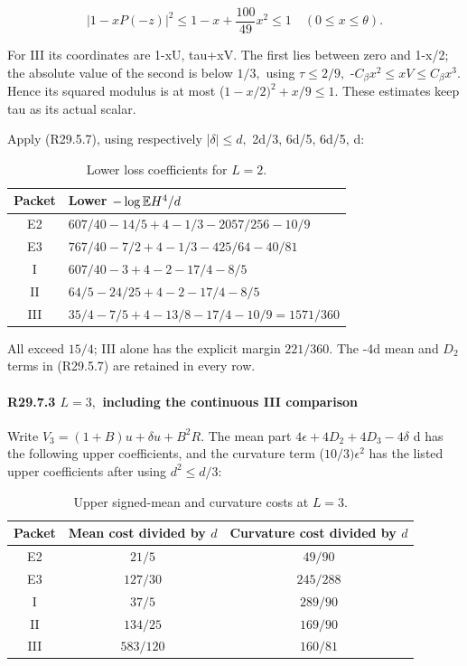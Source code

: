 \[
|1-xP(-z)|^2\le1-x+\frac{100}{49}x^2\le1
\quad(0\le x\le\theta).
\]

For III its coordinates are 1-xU, tau+xV. The first lies between
zero and 1-x/2; the absolute value of the second is below \(1/3,\allowbreak \)
using \(\tau\le 2/9,\allowbreak \) -\(C_\beta x^2\le xV\le C_\beta x^3.\)
Hence its squared modulus is at most
(\(1-x/2)^2+x/9\le 1.\) These estimates keep tau as its actual scalar.

Apply (R29.5.7), using respectively |\(\delta|\le d,\allowbreak \) 2d/3, 6d/5, 6d/5, d:

\begin{table}[htbp]
\centering\small
\setlength{\tabcolsep}{5pt}
\caption{Lower loss coefficients for $L=2$.}\label{tab:oc:r29-L2}
\begin{tabular}{cl}
\toprule
Packet & Lower $-\log\mathbb E H^4/d$\\
\midrule
E2 & $607/40-14/5+4-1/3-2057/256-10/9$\\
E3 & $767/40-7/2+4-1/3-425/64-40/81$\\
I & $607/40-3+4-2-17/4-8/5$\\
II & $64/5-24/25+4-2-17/4-8/5$\\
III & $35/4-7/5+4-13/8-17/4-10/9=1571/360$\\
\bottomrule
\end{tabular}
\end{table}

All exceed \(15/4\); III alone has the explicit margin \(221/360.\)
The -4d mean and \(D_2\) terms in (R29.5.7) are retained in every row.

\paragraph{R29.7.3 \(L=3,\allowbreak \) including the continuous III comparison}

Write \(V_3=(1+B)u+\delta u+B^2R.\) The mean part
\(4\epsilon+4D_2+4D_3-4\delta\) d has the following upper coefficients,
and the curvature term (\(10/3)\epsilon^2\) has the listed upper
coefficients after using \(d^2\le d/3:\)

\begin{table}[htbp]
\centering\small
\setlength{\tabcolsep}{5pt}
\caption{Upper signed-mean and curvature costs at $L=3$.}\label{tab:oc:r29-L3-costs}
\begin{tabular}{ccc}
\toprule
Packet & Mean cost divided by $d$ & Curvature cost divided by $d$\\
\midrule
E2 & $21/5$ & $49/90$\\
E3 & $127/30$ & $245/288$\\
I & $37/5$ & $289/90$\\
II & $134/25$ & $169/90$\\
III & $583/120$ & $160/81$\\
\bottomrule
\end{tabular}
\end{table}

